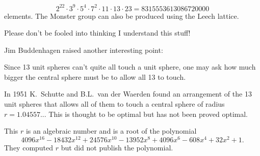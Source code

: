 \[2^{22} \cdot 3^9 \cdot 5^4 \cdot 7^2 \cdot 11 \cdot 13 \cdot 23 = 8315553613086720000\]
%
elements. The Monster group can also be produced using the Leech lattice.

Please don't be fooled into thinking I understand this stuff!

Jim Buddenhagen raised another interesting point:

\noindent
Since 13 unit spheres can't quite all touch a unit sphere, one may ask how much bigger the central sphere must be to allow all 13 to touch.

In 1951 K.\ Schutte and B.L.\ van der Waerden found an arrangement of the 13 unit spheres that allows all of them to touch a central sphere of radius $r=1.04557...$ This is thought to be optimal but has not been proved optimal.

This $r$ is an algebraic number and is a root of the polynomial
%
\[4096 x^{16} - 18432 x^{12} + 24576 x^{10} - 13952 x^8 + 4096 x^6 - 608 x^4 + 32 x^2 + 1.\]
%
They computed $r$ but did not publish the polynomial.

